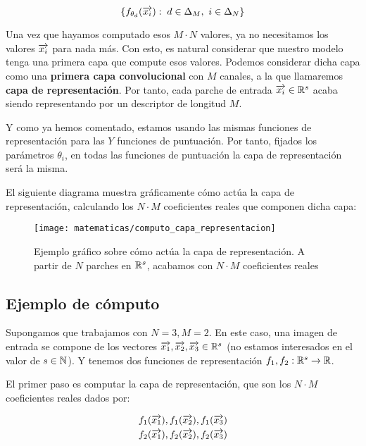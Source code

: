 $$\{f_{\theta_d}(\overrightarrow{x_i}): \; d \in \Delta_{M},\ i \in \Delta_{N} \}$$

Una vez que hayamos computado esos $M \cdot N$ valores, ya no necesitamos los valores $\overrightarrow{x_i}$ para nada más. Con esto, es natural considerar que nuestro modelo tenga una primera capa que compute esos valores. Podemos considerar dicha capa como una \textbf{primera capa convolucional} con $M$ canales, a la que llamaremos \textbf{capa de representación}. Por tanto, cada parche de entrada $\overrightarrow{x_i} \in \mathbb{R}^s$ acaba siendo representando por un descriptor de longitud $M$.

Y como ya hemos comentado, estamos usando las mismas funciones de representación para las $Y$ funciones de puntuación. Por tanto, fijados los parámetros $\theta_i$, en todas las funciones de puntuación la capa de representación será la misma.

El siguiente diagrama muestra gráficamente cómo actúa la capa de representación, calculando los $N \cdot M$ coeficientes reales que componen dicha capa:

\begin{figure}[!hbtp]
	\centering
	\texttt{[image: matematicas/computo\_capa\_representacion]}
	\caption{Ejemplo gráfico sobre cómo actúa la capa de representación. A partir de $N$ parches en $\mathbb{R}^s$, acabamos con $N \cdot M$ coeficientes reales}
\end{figure}


\subsection{Ejemplo de cómputo} \label{ejemplo:funcion_puntuacion}

Supongamos que trabajamos con $N = 3, M = 2$. En este caso, una imagen de entrada se compone de los vectores $\overrightarrow{x_1}, \overrightarrow{x_2}, \overrightarrow{x_3} \in \mathbb{R}^s$ (no estamos interesados en el valor de $s \in \mathbb{N}$). Y tenemos dos funciones de representación $f_1, f_2: \mathbb{R}^s \to \mathbb{R}$.

El primer paso es computar la capa de representación, que son los $N \cdot M$ coeficientes reales dados por:

\begin{equation}
	\begin{split}
		f_1(\overrightarrow{x_1}), f_1(\overrightarrow{x_2}), f_1(\overrightarrow{x_3}) \\
		f_2(\overrightarrow{x_1}), f_2(\overrightarrow{x_2}), f_2(\overrightarrow{x_3})
	\end{split}
\end{equation}

